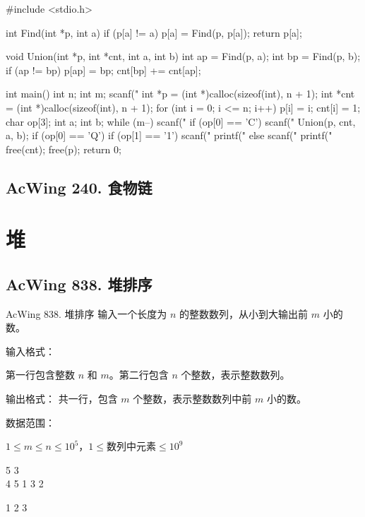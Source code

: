 \begin{mycpptwocol}[]
#include <stdio.h>

int Find(int *p, int a)
{
    if (p[a] != a) {
        p[a] = Find(p, p[a]);
    }
    return p[a];
}

void Union(int *p, int *cnt, int a, int b)
{
    int ap = Find(p, a);
    int bp = Find(p, b);
    if (ap != bp) {
        p[ap] = bp;
        cnt[bp] += cnt[ap];
    }
}

int main()
{
    int n;
    int m;
    scanf("%
    int *p = (int *)calloc(sizeof(int), n + 1);
    int *cnt = (int *)calloc(sizeof(int), n + 1);
    for (int i = 0; i <= n; i++) {
        p[i] = i;
        cnt[i] = 1;
    }
    char op[3];
    int a;
    int b;
    while (m--) {
        scanf("%
        if (op[0] == 'C') {
            scanf("%
            Union(p, cnt, a, b);
        }
        if (op[0] == 'Q') {
            if (op[1] == '1') {
                scanf("%
                printf("%
            } else {
                scanf("%
                printf("%
            }
        }
    }
    free(cnt);
    free(p);
    return 0;
}
\end{mycpptwocol}

\subsection{AcWing 240. 食物链}

\section{堆}
\subsection{AcWing 838. 堆排序}

\begin{titledbox}{AcWing 838. 堆排序}
输入一个长度为 $n$ 的整数数列，从小到大输出前 $m$ 小的数。

输入格式：

第一行包含整数 $n$ 和 $m$。第二行包含 $n$ 个整数，表示整数数列。

输出格式：
共一行，包含 $m$ 个整数，表示整数数列中前 $m$ 小的数。

数据范围：

$1 \le m \le n \le 10^5$，$1 \le 数列中元素 \le 10^9$

\begin{inputblock}
    5 3 \\
    4 5 1 3 2
\end{inputblock}
\begin{outputblock}
    1 2 3
\end{outputblock}
        
\end{titledbox}

